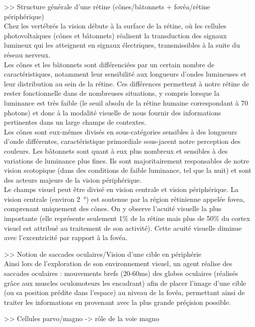 >> Structure générale d'une rétine (cônes/bâtonnets + fovéa/rétine périphérique)\\
Chez les vertébrés la vision débute à la surface de la rétine, où les cellules photovoltaïques (cônes et bâtonnets) réalisent la transduction des signaux lumineux qui les atteignent en signaux électriques, transmissibles à la suite du réseau nerveux.\\
Les cônes et les bâtonnets sont différenciées par un certain nombre de caractéristiques, notamment leur sensibilité aux longueurs d'ondes lumineuses et leur distribution au sein de la rétine. Ces différences permettent à notre rétine de rester fonctionnelle dans de nombreuses situations, y compris lorsque la luminance est très faible (le seuil absolu de la rétine humaine correspondant à 70 photons) et donc à la modalité visuelle de nous fournir des informations pertinentes dans un large champs de contextes.\\
Les cônes sont eux-mêmes divisés en sous-catégories sensibles à des longueurs d'onde différentes, caractéristique primordiale sous-jacent notre perception des couleurs.
Les bâtonnets sont quant à eux plus nombreux et sensibles à des variations de luminance plus fines. Ils sont majoritairement responsables de notre vision scotopique (dans des conditions de faible luminance, tel que la nuit) et sont des acteurs majeurs de la vision périphérique.\\
Le champs visuel peut être divisé en vision centrale et vision périphérique. La vision centrale (environ \SI{2}{\degree}) est soutenue par la région rétinienne appelée fovea, comprenant uniquement des cônes. On y observe l'acuité visuelle la plus importante (elle représente seulement 1\% de la rétine mais plus de 50\% du cortex visuel est attribué au traitement de son activité). Cette acuité visuelle diminue avec l'excentricité par rapport à la fovéa.

>> Notion de saccades oculaires/Vision d'une cible en périphérie\\
Ainsi lors de l'exploration de son environnement visuel, un agent réalise des saccades oculaires : mouvements brefs (20-60\si{\milli\second}) des globes oculaires (réalisés grâce aux muscles oculomoteurs les encadrant) afin de placer l'image d'une cible (ou sa position prédite dans l'espace) au niveau de la fovéa, permettant ainsi de traiter les informations en provenant avec la plus grande préçision possible.

>> Cellules parvo/magno -> rôle de la voie magno\\

